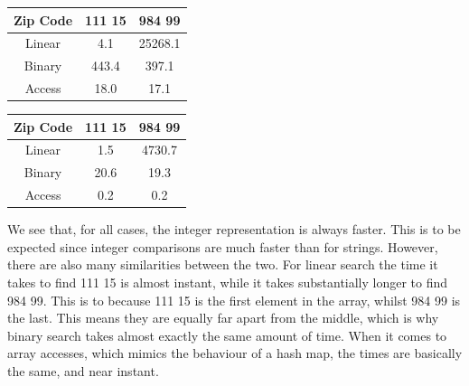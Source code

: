 \documentclass[a4paper, 11pt]{article}
\begin{document}
	\begin{minipage}{0.45\textwidth}
		\centering
		\begin{tabular}{|c|c|c|}
			\hline
			\textbf{Zip Code} & \textbf{111 15} & \textbf{984 99} \\
			\hline
			Linear & 4.1 & 25268.1 \\
			\hline
			Binary & 443.4 & 397.1 \\
			\hline
			Access & 18.0 & 17.1 \\
			\hline
		\end{tabular}
	\end{minipage}
	\begin{minipage}{0.45\textwidth}
		\centering
		\begin{tabular}{|c|c|c|}
			\hline
			\textbf{Zip Code} & \textbf{111 15} & \textbf{984 99} \\
			\hline
			Linear & 1.5 & 4730.7 \\
			\hline
			Binary & 20.6 & 19.3 \\
			\hline
			Access & 0.2 & 0.2 \\
			\hline
		\end{tabular}
	\end{minipage}

	We see that, for all cases, the integer representation is always faster.
	This is to be expected since integer comparisons are much faster than for strings.
	However, there are also many similarities between the two.
	For linear search the time it takes to find 111 15 is almost instant, while it takes substantially longer to find 984 99.
	This is to because 111 15 is the first element in the array, whilst 984 99 is the last.
	This means they are equally far apart from the middle, which is why binary search takes almost exactly the same amount of time.
	When it comes to array accesses, which mimics the behaviour of a hash map, the times are basically the same, and near instant.
\end{document}
